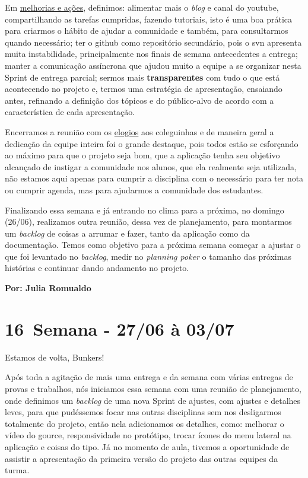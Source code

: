 Em \underline{melhorias e ações}, definimos: alimentar mais o \textit{blog} e canal do \gls{youtube}, compartilhando as tarefas cumpridas, fazendo tutoriais, isto é uma boa prática para criarmos o hábito de ajudar a comunidade e também, para consultarmos quando necessário; ter o \gls{github} como repositório secundário, pois o \acs{svn} apresenta muita instabilidade, principalmente nos finais de semana antecedentes a entrega; manter a comunicação assíncrona que ajudou muito a equipe a se organizar nesta \gls{Sprint} de entrega parcial; sermos mais \textbf{transparentes} com tudo o que está acontecendo no projeto e, termos uma estratégia de apresentação, ensaiando antes, refinando a definição dos tópicos e do público-alvo de acordo com a característica de cada apresentação.

Encerramos a reunião com os \underline{elogios} aos coleguinhas e de maneira geral a dedicação da equipe inteira foi o grande destaque, pois todos estão se esforçando ao máximo para que o projeto seja bom, que a aplicação tenha seu objetivo alcançado de instigar a comunidade nos alunos, que ela realmente seja utilizada, não estamos aqui apenas para cumprir a disciplina com o necessário para ter nota ou cumprir agenda, mas para ajudarmos a comunidade dos estudantes.

Finalizando essa semana e já entrando no clima para a próxima, no domingo (26/06), realizamos outra reunião, dessa vez de planejamento, para montarmos um \textit{backlog} de coisas a arrumar e fazer, tanto da aplicação como da documentação. Temos como objetivo para a próxima semana começar a ajustar o que foi levantado no \textit{backlog}, medir no \textit{planning poker} o tamanho das próximas histórias e continuar dando andamento no projeto. 

\textbf{Por: Julia Romualdo}

\section{16\textordfeminine \, Semana - 27/06 à 03/07}
Estamos de volta, Bunkers!

Após toda a agitação de mais uma entrega e da semana com várias entregas de provas e trabalhos, nós iniciamos essa semana com uma reunião de planejamento, onde definimos um \textit{backlog} de uma nova \gls{Sprint} de ajustes, com ajustes e detalhes leves, para que pudéssemos focar nas outras disciplinas sem nos desligarmos totalmente do projeto, então nela adicionamos os detalhes, como: melhorar o vídeo do \gls{gource}, responsividade no protótipo, trocar ícones do menu lateral na aplicação e coisas do tipo. Já no momento de aula, tivemos a oportunidade de assistir a apresentação da primeira versão do projeto das outras equipes da turma. 

